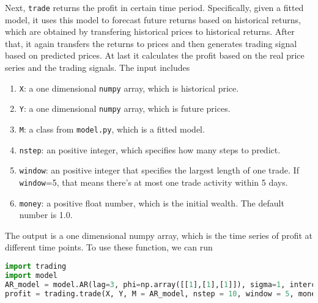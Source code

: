 Next, \texttt{trade} returns the profit in certain time period. Specifically, given a fitted model, it uses this model to forecast future returns based on historical returns, which are obtained by transfering historical prices 
to historical returns. After that, it again transfers the returns to prices and then generates trading signal 
based on predicted prices. At last it calculates the profit based on the real price series and the trading signals. The input includes
\begin{enumerate}
	\item \texttt{X}: a one dimensional \texttt{numpy} array, which is historical price.
	\item \texttt{Y}: a one dimensional \texttt{numpy} array, which is future prices.
	\item \texttt{M}: a class from \texttt{model.py}, which is a fitted model.
	\item \texttt{nstep}: an positive integer, which specifies how many steps to predict.
    \item \texttt{window}: an positive integer that specifies the largest length of one trade. If \texttt{window}=5, that means there's at most one trade activity within 5 days. 
	\item \texttt{money}: a positive float number, which is the initial wealth. The default number is 1.0.
\end{enumerate}
The output is a one dimensional numpy array, which is the time series of profit at different time points.
To use these function, we can run 
\begin{lstlisting}[language=Python]
import trading
import model
AR_model = model.AR(lag=3, phi=np.array([[1],[1],[1]]), sigma=1, intercept=0.1)
profit = trading.trade(X, Y, M = AR_model, nstep = 10, window = 5, money = 100) 
\end{lstlisting}


